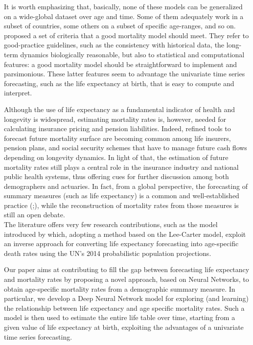 \documentclass[a4,11pt]{article}
\begin{document}
It is worth emphasizing that, basically, none of these models can be generalized on a wide-global dataset over age and time. Some of them adequately work in a subset of countries, some others on a subset of specific age-ranges, and so on. \cite{Cairns} proposed a set of criteria that a good mortality model should meet.
They refer to good-practice guidelines, such as the consistency with historical data, the long-term dynamics biologically reasonable, but also to statistical and computational features: a good mortality model should be straightforward to implement and parsimonious. These latter features seem to advantage the univariate time series forecasting, such as the life expectancy at birth, that is easy to compute and interpret. 

Although the use of life expectancy as a fundamental indicator of health and longevity is widespread, estimating mortality rates is, however, needed for calculating insurance pricing and pension liabilities. 
Indeed, refined tools to forecast future mortality surface are becoming common among life insurers, pension plans, and social security schemes that have to manage future cash flows depending on longevity dynamics. In light of that, the estimation of future mortality rates still plays a central role in the insurance industry and national public health systems, thus offering cues for further discussion among both demographers and actuaries.
In fact, from a global perspective, the forecasting of summary measures (such as life expectancy) is a common and well-established practice (\cite{Miller86};\cite{Lee93}), while the reconstruction of mortality rates from those measures is still an open debate.\\
The literature offers very few research contributions, such as the model introduced by \cite{Sevcikova} which, adopting a method based on the Lee-Carter model, exploit an inverse approach for converting life expectancy forecasting into age-specific death rates using the UN’s 2014 probabilistic population projections. 

Our paper aims at contributing to fill the gap between forecasting life expectancy and mortality rates by proposing a novel approach, based on Neural Networks, to obtain age-specific mortality rates from a demographic summary measure. In particular, we develop a Deep Neural Network model for exploring (and learning) the relationship between life expectancy and age specific mortality rates. Such a model is then used to estimate the entire life table over time, starting from a given value of life expectancy at birth, exploiting the advantages of a univariate time series forecasting.
\end{document}
